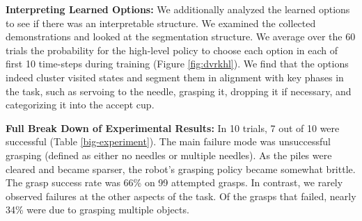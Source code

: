 \vspace{0.25em} \noindent \textbf{Interpreting Learned Options: }
We additionally analyzed the learned options to see if there was an interpretable structure.
We examined the collected demonstrations and looked at the segmentation structure.
We average over the 60 trials the probability for the high-level policy to choose each option in each of first 10 time-steps during training (Figure \ref{fig:dvrkhl}). We find that the options indeed cluster visited states and segment them in alignment with key phases in the task, such as servoing to the needle, grasping it, dropping it if necessary, and categorizing it into the accept cup. 

\vspace{0.25em} \noindent \textbf{Full Break Down of Experimental Results: }
In 10 trials, 7 out of 10 were successful (Table \ref{big-experiment}). The main failure mode was unsuccessful grasping (defined as either no needles or multiple needles). As the piles were cleared and became sparser, the robot's grasping policy became somewhat brittle. The grasp success rate was 66\% on 99 attempted grasps. In contrast, we rarely observed failures at the other aspects of the task. Of the grasps that failed, nearly 34\% were due to grasping multiple objects.


